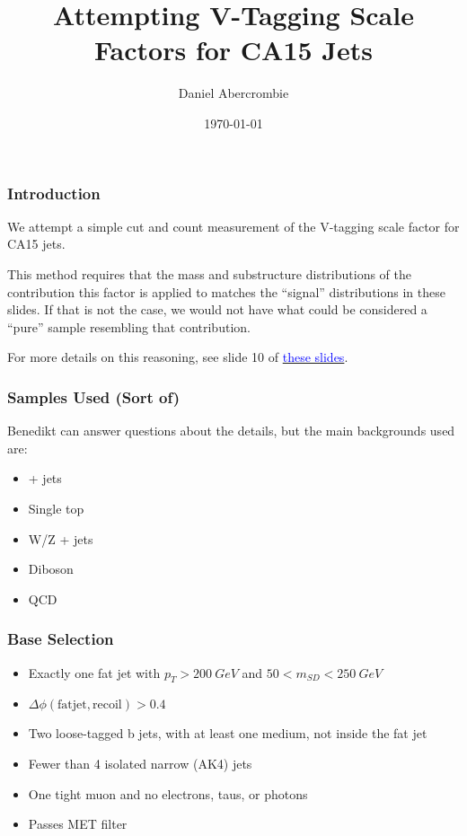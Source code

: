 \documentclass{beamer}
\author[D. Abercrombie]{
  Daniel Abercrombie
}
\title{\bf \sffamily Attempting V-Tagging Scale Factors for CA15 Jets}
\date{\today}
\begin{document}
\begin{frame}[nonumbering]
  \titlepage
\end{frame}

\begin{frame}
  \frametitle{Introduction}

  We attempt a simple cut and count measurement of the V-tagging scale factor for CA15 jets.

  This method requires that the mass and substructure distributions of the contribution this factor is applied to
  matches the ``signal'' distributions in these slides.
  If that is not the case, we would not have what could be considered a ``pure'' sample resembling that contribution.

  For more details on this reasoning, see slide 10 of
  \href{http://t3serv001.mit.edu/~dabercro/docs/WTagStudy/dabercro_WTagStudy_160727.pdf}
       {\textcolor{blue}{these slides}}.

\end{frame}

\begin{frame}
  \frametitle{Samples Used (Sort of)}

  Benedikt can answer questions about the details, but the main backgrounds used are:

  \begin{itemize}
  \item \ttbar + jets
  \item Single top
  \item W/Z + jets
  \item Diboson
  \item QCD
  \end{itemize}

\end{frame}

\begin{frame}
  \frametitle{Base Selection}

  \begin{itemize}
  \item Exactly one fat jet with $p_T > \SI{200}{GeV}$ and $50 < m_{SD} < \SI{250}{GeV}$
  \item $\Delta\phi\mathrm{(fat jet, recoil)} > 0.4$
  \item Two loose-tagged b jets, with at least one medium, not inside the fat jet
  \item Fewer than 4 isolated narrow (AK4) jets
  \item One tight muon and no electrons, taus, or photons
  \item Passes MET filter
  \end{itemize}

\end{frame}
\end{document}
